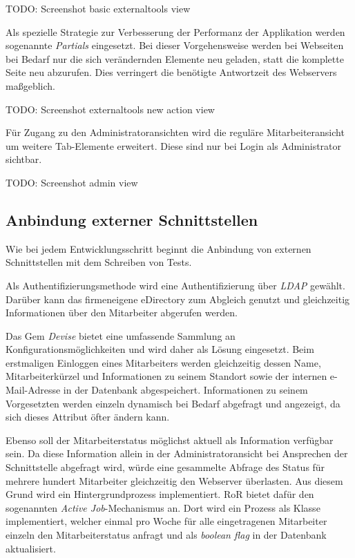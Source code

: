 TODO: Screenshot basic externaltools view

Als spezielle Strategie zur Verbesserung der Performanz der Applikation werden sogenannte
\textit{Partials} eingesetzt. Bei dieser Vorgehensweise werden bei Webseiten bei Bedarf nur die
sich verändernden Elemente neu geladen, statt die komplette Seite neu abzurufen.
Dies verringert die benötigte Antwortzeit des Webservers maßgeblich.

TODO: Screenshot externaltools new action view

Für Zugang zu den Administratoransichten wird die reguläre Mitarbeiteransicht um weitere Tab-Elemente
erweitert. Diese sind nur bei Login als Administrator sichtbar.

TODO: Screenshot admin view

\subsection{Anbindung externer Schnittstellen}
\label{sec:Anbindung externer Schnittstellen}
Wie bei jedem Entwicklungsschritt beginnt die Anbindung von externen Schnittstellen mit dem Schreiben
von Tests.

Als Authentifizierungsmethode wird eine Authentifizierung über \textit{\acs{LDAP}} gewählt. Darüber
kann das firmeneigene eDirectory zum Abgleich genutzt und gleichzeitig Informationen über
den Mitarbeiter abgerufen werden.

Das Gem \textit{Devise} bietet eine umfassende Sammlung an Konfigurationsmöglichkeiten und wird
daher als Lösung eingesetzt. Beim erstmaligen Einloggen eines Mitarbeiters werden gleichzeitig
dessen Name, Mitarbeiterkürzel und Informationen zu seinem Standort sowie der internen
e-Mail-Adresse in der Datenbank abgespeichert. Informationen zu seinem Vorgesetzten werden einzeln
dynamisch bei Bedarf abgefragt und angezeigt, da sich dieses Attribut öfter ändern kann.

Ebenso soll der Mitarbeiterstatus möglichst aktuell als Information verfügbar sein. Da diese
Information allein in der Administratoransicht \bzw bei Ansprechen der Schnittstelle abgefragt wird,
würde eine gesammelte Abfrage des Status für mehrere hundert Mitarbeiter gleichzeitig den Webserver
überlasten. Aus diesem Grund wird ein Hintergrundprozess implementiert. RoR bietet dafür den
sogenannten \textit{Active Job}-Mechanismus an. Dort wird ein Prozess als Klasse implementiert,
welcher einmal pro Woche für alle eingetragenen Mitarbeiter einzeln den Mitarbeiterstatus anfragt
und als \textit{boolean flag} in der Datenbank aktualisiert.


